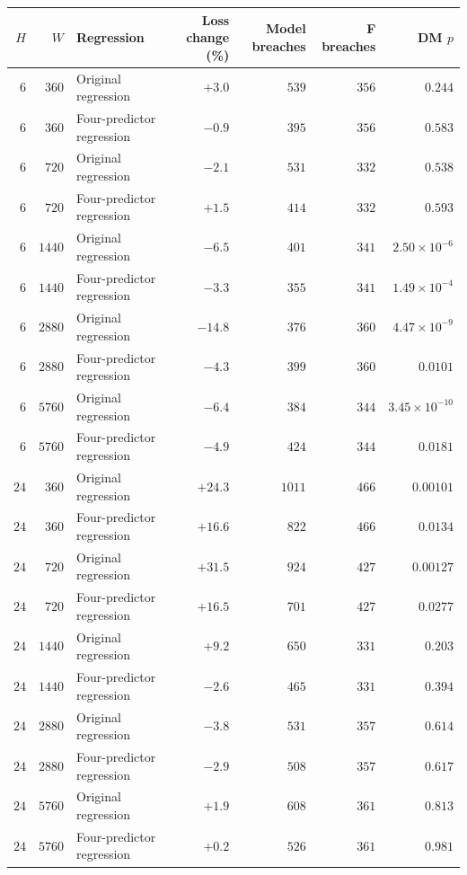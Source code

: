 \begin{center}\begin{tabular}{rrp{33mm}rrrr}
\toprule
$H$ & $W$ & Regression & Loss change (\%) & Model breaches & F breaches & DM $p$ \\
\midrule
$6$ & $360$ & Original regression & $+3.0$ & $539$ & $356$ & $0.244$ \\ %
$6$ & $360$ & Four-predictor regression & $-0.9$ & $395$ & $356$ & $0.583$ \\ %
$6$ & $720$ & Original regression & $-2.1$ & $531$ & $332$ & $0.538$ \\ %
$6$ & $720$ & Four-predictor regression & $+1.5$ & $414$ & $332$ & $0.593$ \\ %
$6$ & $1440$ & Original regression & $-6.5$ & $401$ & $341$ & $2.50\times10^{-6}$ \\ %
$6$ & $1440$ & Four-predictor regression & $-3.3$ & $355$ & $341$ & $1.49\times10^{-4}$ \\ %
$6$ & $2880$ & Original regression & $-14.8$ & $376$ & $360$ & $4.47\times10^{-9}$ \\ %
$6$ & $2880$ & Four-predictor regression & $-4.3$ & $399$ & $360$ & $0.0101$ \\ %
$6$ & $5760$ & Original regression & $-6.4$ & $384$ & $344$ & $3.45\times10^{-10}$ \\ %
$6$ & $5760$ & Four-predictor regression & $-4.9$ & $424$ & $344$ & $0.0181$ \\ %
$24$ & $360$ & Original regression & $+24.3$ & $1011$ & $466$ & $0.00101$ \\ %
$24$ & $360$ & Four-predictor regression & $+16.6$ & $822$ & $466$ & $0.0134$ \\ %
$24$ & $720$ & Original regression & $+31.5$ & $924$ & $427$ & $0.00127$ \\ %
$24$ & $720$ & Four-predictor regression & $+16.5$ & $701$ & $427$ & $0.0277$ \\ %
$24$ & $1440$ & Original regression & $+9.2$ & $650$ & $331$ & $0.203$ \\ %
$24$ & $1440$ & Four-predictor regression & $-2.6$ & $465$ & $331$ & $0.394$ \\ %
$24$ & $2880$ & Original regression & $-3.8$ & $531$ & $357$ & $0.614$ \\ %
$24$ & $2880$ & Four-predictor regression & $-2.9$ & $508$ & $357$ & $0.617$ \\ %
$24$ & $5760$ & Original regression & $+1.9$ & $608$ & $361$ & $0.813$ \\ %
$24$ & $5760$ & Four-predictor regression & $+0.2$ & $526$ & $361$ & $0.981$ \\ %
\bottomrule
\end{tabular}\end{center}
